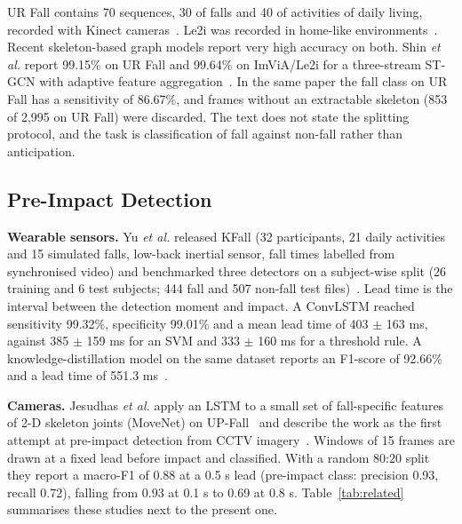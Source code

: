 \documentclass[journal]{IEEEtran}
\begin{document}
UR Fall contains 70 sequences, 30 of falls and 40 of activities of daily living, recorded with Kinect cameras~\cite{urfd}. Le2i was recorded in home-like environments~\cite{le2i}. Recent skeleton-based graph models report very high accuracy on both. Shin \textit{et al.} report 99.15\% on UR Fall and 99.64\% on ImViA/Le2i for a three-stream ST-GCN with adaptive feature aggregation~\cite{shin}. In the same paper the fall class on UR Fall has a sensitivity of 86.67\%, and frames without an extractable skeleton (853 of 2,995 on UR Fall) were discarded. The text does not state the splitting protocol, and the task is classification of fall against non-fall rather than anticipation.


\subsection{Pre-Impact Detection}\label{sub:pre}

\textbf{Wearable sensors.} Yu \textit{et al.} released KFall (32 participants, 21 daily activities and 15 simulated falls, low-back inertial sensor, fall times labelled from synchronised video) and benchmarked three detectors on a subject-wise split (26 training and 6 test subjects; 444 fall and 507 non-fall test files)~\cite{kfall}. Lead time is the interval between the detection moment and impact. A ConvLSTM reached sensitivity 99.32\%, specificity 99.01\% and a mean lead time of 403 $\pm$ 163 ms, against 385 $\pm$ 159 ms for an SVM and 333 $\pm$ 160 ms for a threshold rule. A knowledge-distillation model on the same dataset reports an F1-score of 92.66\% and a lead time of 551.3 ms~\cite{prefallkd}.


\textbf{Cameras.} Jesudhas \textit{et al.} apply an LSTM to a small set of fall-specific features of 2-D skeleton joints (MoveNet) on UP-Fall~\cite{upfall} and describe the work as the first attempt at pre-impact detection from CCTV imagery~\cite{jesudhas}. Windows of 15 frames are drawn at a fixed lead before impact and classified. With a random 80:20 split they report a macro-F1 of 0.88 at a 0.5 s lead (pre-impact class: precision 0.93, recall 0.72), falling from 0.93 at 0.1 s to 0.69 at 0.8 s. Table~\ref{tab:related} summarises these studies next to the present one.
\end{document}
